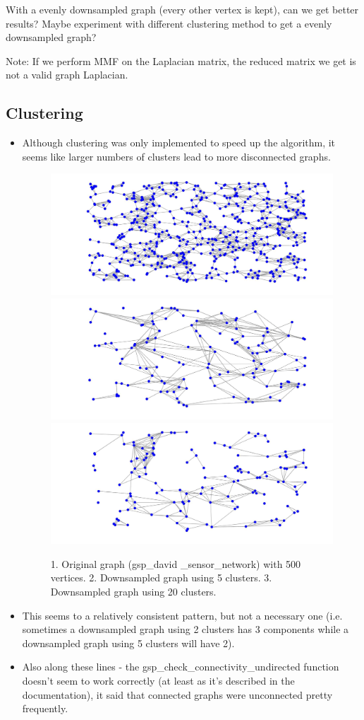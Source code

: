 \documentclass[a4paper]{article}
\begin{document}
With a evenly downsampled graph (every other vertex is kept), can we get better results?  Maybe experiment with different clustering method to get a evenly downsampled graph?

Note: If we perform MMF on the Laplacian matrix, the reduced matrix we get is not a valid graph Laplacian.

\subsection{Clustering}

\begin{itemize}
\item Although clustering was only implemented to speed up the algorithm, it seems like larger numbers of clusters lead to more disconnected graphs.

\begin{figure}[H]
\centering
\includegraphics[width = 6 cm]{clusters/original_sensor}
\includegraphics[width = 6 cm]{clusters/sensor_5_clusters}
\includegraphics[width = 6 cm]{clusters/sensor_20_clusters}

\caption{1. Original graph (gsp\_david \_sensor\_network) with 500 vertices. 2. Downsampled graph using 5 clusters. 3. Downsampled graph using 20 clusters.}
\end{figure}

\item This seems to a relatively consistent pattern, but not a necessary one (i.e. sometimes a downsampled graph using 2 clusters has 3 components while a downsampled graph using 5 clusters will have 2). 

\item Also along these lines - the gsp\_check\_connectivity\_undirected function doesn't seem to work correctly (at least as it's described in the documentation), it said that connected graphs were unconnected pretty frequently.

\end{itemize}
\end{document}
